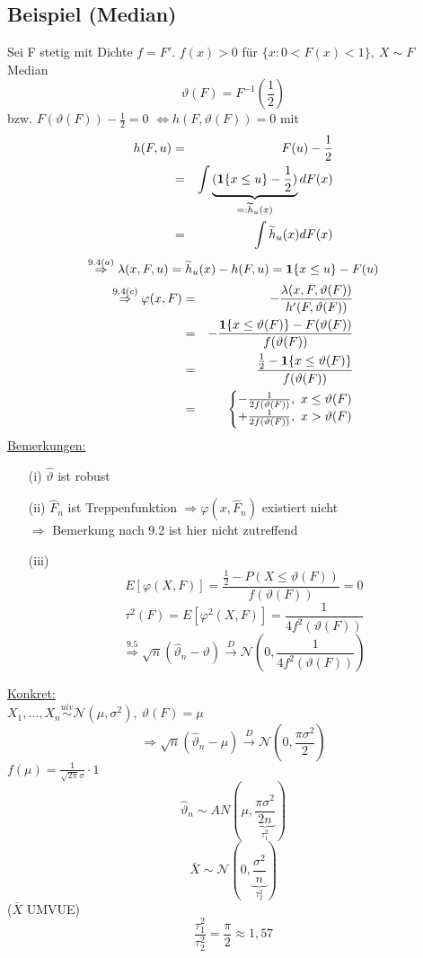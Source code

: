 \documentclass[a4paper,11pt,twoside,titlepage]{article}
\newcommand\NN{ \mathcal{N} } %
\newcommand{\ind}{\text{\bf{1}}} %
\newcommand{\uiv}{\ensuremath{\stackrel{uiv}{\sim}}}
\begin{document}
\subsection{Beispiel (Median)}
Sei F stetig mit Dichte $f=F'$. $f(x)>0$ für $\{x:0<F(x)<1\},\ X\sim F$\\
Median $$\vartheta(F)=F^{-1}(\frac12)$$ bzw. $F(\vartheta(F))-\frac12=0$ $\Leftrightarrow h(F,\vartheta(F))=0$ mit 
\begin{eqnarray*}
h(F,u)&=&F(u)-\frac12\\
&=&\int\underbrace{(\ind\{x\leq u\}-\frac12)}_{=:\widetilde h_u(x)}dF(x)\\
&=&\int \widetilde h_u(x)dF(x)
\end{eqnarray*}
\[\stackrel{9.4(a)}{\Rightarrow}\lambda(x,F,u)=\widetilde h_u(x)-h(F,u)=\ind\{x\leq u\}-F(u)\]
\begin{eqnarray*}\stackrel{9.4(c)}{\Rightarrow}\varphi(x,F)
&=&-\frac{\lambda(x,F,\vartheta(F))}{h'(F,\vartheta(F))}\\
&=&-\frac{\ind\{x\leq \vartheta(F)\}-F(\vartheta(F))}{f(\vartheta(F))}\\
&=&\frac{\frac12-\ind\{x\leq \vartheta(F)\}}{f(\vartheta(F))}\\
&=&\left\{
\begin{matrix}
-\frac{1}{2f(\vartheta(F))},\ x\leq \vartheta(F)\\
+\frac{1}{2f(\vartheta(F))},\ x>\vartheta(F)
\end{matrix}\right.
\end{eqnarray*}
\newpage
\underline{Bemerkungen:}
\begin{itemize}
\item[(i) ]$\hat\vartheta$ ist robust
\item[(ii) ]$\hat F_n$ ist Treppenfunktion $\Rightarrow \varphi(x,\hat F_n)$ existiert nicht\\
$\Rightarrow$ Bemerkung nach 9.2 ist hier nicht zutreffend
\item[(iii) ]$$E[\varphi(X,F)]=\frac{\frac12-P(X\leq\vartheta(F))}{f(\vartheta(F))}=0$$
$$\tau^2(F)=E[\varphi^2(X,F)]=\frac{1}{4f^2(\vartheta(F))}$$
$$\stackrel{9.5}{\Rightarrow} \sqrt n(\hat\vartheta_n-\vartheta)\stackrel{D}{\rightarrow}\NN(0,\frac{1}{4f^2(\vartheta(F))})$$
\end{itemize}

\underline{Konkret:}\\
$X_1,\ldots,X_n\uiv\NN(\mu,\sigma^2),\ \vartheta(F)=\mu$
$$\Rightarrow\sqrt n(\hat\vartheta_n-\mu)\stackrel{D}{\rightarrow}\NN(0,\frac{\pi\sigma^2}{2})$$
$f(\mu)=\frac{1}{\sqrt{2\pi}\sigma}\cdot1$
\[\hat\vartheta_n\sim AN(\mu,\underbrace{\frac{\pi\sigma^2}{2n}}_{\tau_1^2})\]
$$\bar X\sim\NN(0,\underbrace{\frac{\sigma^2}{n}}_{\tau^2_2})$$
($\bar X$ UMVUE)
\[\frac{\tau_1^2}{\tau_2^2}=\frac{\pi}{2}\approx1,57\]
\end{document}
